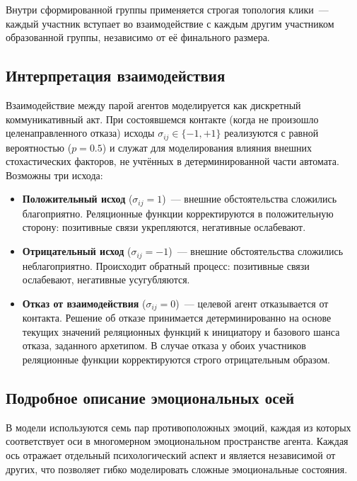 \documentclass[12pt]{article}
\begin{document}
Внутри сформированной группы применяется строгая топология клики~--- каждый участник вступает во взаимодействие с каждым другим участником образованной группы, независимо от её финального размера.

\subsection{Интерпретация взаимодействия}

Взаимодействие между парой агентов моделируется как дискретный коммуникативный акт. При состоявшемся контакте (когда не произошло целенаправленного отказа) исходы $\sigma_{ij} \in \{-1, +1\}$ реализуются с равной вероятностью ($p = 0.5$) и служат для моделирования влияния внешних стохастических факторов, не учтённых в детерминированной части автомата. Возможны три исхода:
\begin{itemize}
    \item \textbf{Положительный исход} ($\sigma_{ij} = 1$)~--- внешние обстоятельства сложились благоприятно. Реляционные функции корректируются в положительную сторону: позитивные связи укрепляются, негативные ослабевают.
    \item \textbf{Отрицательный исход} ($\sigma_{ij} = -1$)~--- внешние обстоятельства сложились неблагоприятно. Происходит обратный процесс: позитивные связи ослабевают, негативные усугубляются.
    \item \textbf{Отказ от взаимодействия} ($\sigma_{ij} = 0$)~--- целевой агент отказывается от контакта. Решение об отказе принимается детерминированно на основе текущих значений реляционных функций к инициатору и базового шанса отказа, заданного архетипом. В случае отказа у обоих участников реляционные функции корректируются строго отрицательным образом.
\end{itemize}

\subsection{Подробное описание эмоциональных осей}

В модели используются семь пар противоположных эмоций, каждая из которых соответствует оси в многомерном эмоциональном пространстве агента. Каждая ось отражает отдельный психологический аспект и является независимой от других, что позволяет гибко моделировать сложные эмоциональные состояния.
\end{document}

